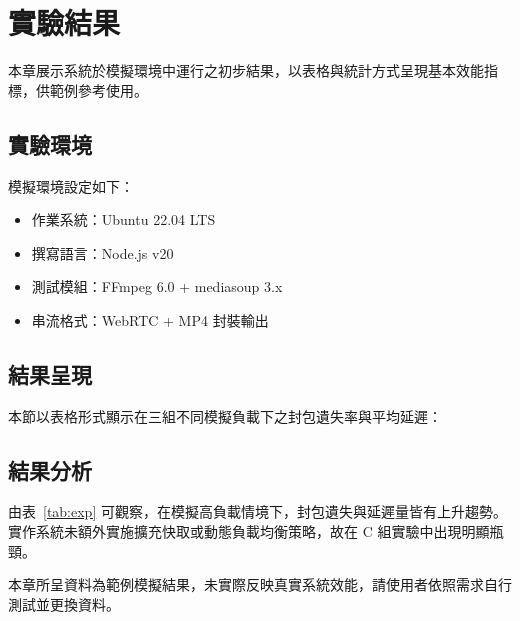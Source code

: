 \chapter{實驗結果}

本章展示系統於模擬環境中運行之初步結果，以表格與統計方式呈現基本效能指標，供範例參考使用。

\section{實驗環境}

模擬環境設定如下：

\begin{itemize}
    \item 作業系統：Ubuntu 22.04 LTS
    \item 撰寫語言：Node.js v20
    \item 測試模組：FFmpeg 6.0 + mediasoup 3.x
    \item 串流格式：WebRTC + MP4 封裝輸出
\end{itemize}

\section{結果呈現}

本節以表格形式顯示在三組不同模擬負載下之封包遺失率與平均延遲：


\section{結果分析}

由表~\ref{tab:exp} 可觀察，在模擬高負載情境下，封包遺失與延遲量皆有上升趨勢。實作系統未額外實施擴充快取或動態負載均衡策略，故在 C 組實驗中出現明顯瓶頸。

本章所呈資料為範例模擬結果，未實際反映真實系統效能，請使用者依照需求自行測試並更換資料。
